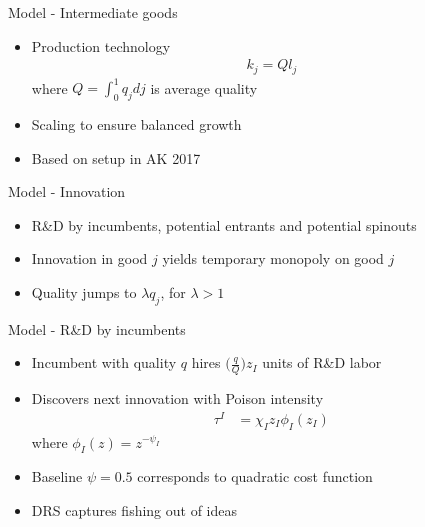 \documentclass[english,usenames,dvipsnames]{beamer}
\begin{document}
\begin{frame}{Model - Intermediate goods}
\begin{itemize}
	\item Production technology
	\begin{align*}
		k_j = Q l_j
	\end{align*}
	where $Q = \int_0^1 q_j dj$ is average quality
	\item Scaling to ensure balanced growth
	\item Based on setup in AK 2017
\end{itemize}
\end{frame}

\begin{frame}{Model - Innovation}
\begin{itemize}
	\item R\&D by incumbents, potential entrants and potential spinouts 
	\item Innovation in good $j$ yields temporary monopoly on good $j$
	\item Quality jumps to $\lambda q_j$, for $\lambda > 1$
\end{itemize}
\end{frame}

\begin{frame}{Model - R\&D by incumbents}
\begin{itemize}
	\item Incumbent with quality $q$ hires $\big(\frac{q}{Q}\big)z_I$ units of R\&D labor
	\item Discovers next innovation with Poison intensity
	\begin{align*}
		\tau^I &= \chi_I z_I \phi_I(z_I) 
	\end{align*}
	where $\phi_I(z) = z^{-\psi_I}$
	\item Baseline $\psi = 0.5$ corresponds to quadratic cost function
	\item DRS captures \alert{fishing out} of ideas
\end{itemize}
\end{frame}

\end{document}
